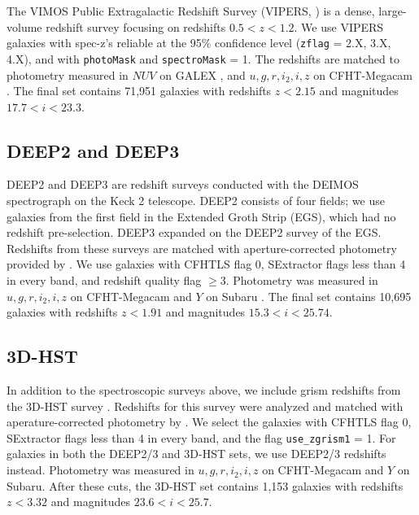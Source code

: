 The VIMOS Public Extragalactic Redshift Survey (VIPERS, \citealt{Scodeggio2018a}) is a dense, large-volume redshift survey focusing on redshifts $0.5 < z < 1.2$.
We use VIPERS galaxies with spec-z's reliable at the 95\% confidence level (\texttt{zflag} = 2.X, 3.X, 4.X), and with \texttt{photoMask} and \texttt{spectroMask} = 1.
The redshifts are matched to photometry measured in $NUV$ on GALEX \citep{Martin2005a}, and $u,g,r,i_2,i,z$ on CFHT-Megacam \citep{Hudelot2012}. 
The final set contains 71,951 galaxies with redshifts $z < 2.15$ and magnitudes $17.7 < i < 23.3$. 

\subsection{DEEP2 and DEEP3}

DEEP2 and DEEP3 are redshift surveys conducted with the DEIMOS spectrograph on the Keck 2 telescope.
DEEP2 \citep{Newman2013b} consists of four fields; we use galaxies from the first field in the Extended Groth Strip (EGS), which had no redshift pre-selection.
DEEP3 \citep{Cooper2011} expanded on the DEEP2 survey of the EGS.
Redshifts from these surveys are matched with aperture-corrected photometry provided by \citet{Zhou2019a}.
We use galaxies with CFHTLS flag 0, SExtractor flags less than 4 in every band, and redshift quality flag $\geq 3$.
Photometry was measured in $u,g,r,i_2,i,z$ on CFHT-Megacam and $Y$ on Subaru \citep{Miyazaki2002}.
The final set contains 10,695 galaxies with redshifts $z < 1.91$ and magnitudes $15.3 < i < 25.74$.


\subsection{3D-HST}

In addition to the spectroscopic surveys above, we include grism redshifts from the 3D-HST survey \citep{Newman2013b,Momcheva2016b}.
Redshifts for this survey were analyzed and matched with aperature-corrected photometry by \citet{Zhou2019a}.
We select the galaxies with CFHTLS flag 0, SExtractor flags less than 4 in every band, and the flag \texttt{use\_zgrism1} = 1.
For galaxies in both the DEEP2/3 and 3D-HST sets, we use DEEP2/3 redshifts instead.
Photometry was measured in $u,g,r,i_2,i,z$ on CFHT-Megacam and $Y$ on Subaru.
After these cuts, the 3D-HST set contains 1,153 galaxies with redshifts $z < 3.32$ and magnitudes $23.6 < i < 25.7$.


